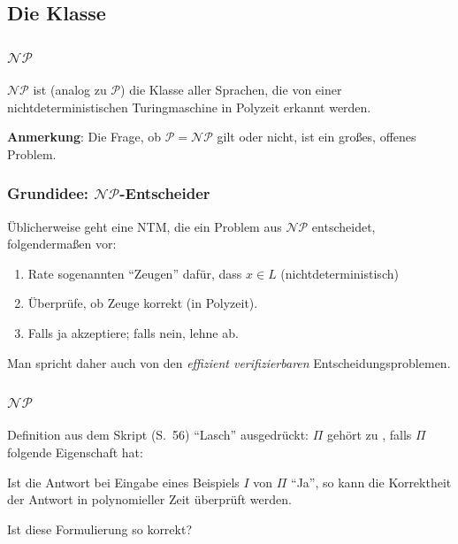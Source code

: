 

\subsection{Die Klasse \classNP}
\begin{frame}
\frametitle{$\mathcal{NP}$}

$\mathcal{NP}$ ist (analog zu $\mathcal{P}$) die Klasse aller Sprachen, die von einer nichtdeterministischen Turingmaschine in Polyzeit erkannt werden.

\ducttape{1cm}

\textbf{Anmerkung}: Die Frage, ob $\mathcal{P} = \mathcal{NP}$ gilt oder nicht, ist ein großes, offenes Problem.
\end{frame}

\begin{frame}
\frametitle{Grundidee: $\mathcal{NP}$-Entscheider}
Üblicherweise geht eine NTM, die ein Problem aus $\mathcal{NP}$ entscheidet, folgendermaßen vor: 
\begin{enumerate}
\item Rate sogenannten "`Zeugen"' dafür, dass $x \in L$ (nichtdeterministisch)
\item Überprüfe, ob Zeuge korrekt (in Polyzeit).
\item Falls ja akzeptiere; falls nein, lehne ab.
\end{enumerate}
Man spricht daher auch von den \emph{effizient verifizierbaren} Entscheidungsproblemen.
\end{frame}

\begin{frame}
\frametitle{$\mathcal{NP}$}

\begin{block}{Definition aus dem Skript (S.~56)}
"`Lasch"' ausgedrückt: $\Pi$ gehört zu \classNP, falls $\Pi$ folgende Eigenschaft hat:

Ist die Antwort bei Eingabe eines Beispiels $I$ von $\Pi$ "`Ja"', so kann die Korrektheit der Antwort in polynomieller Zeit überprüft werden.
\end{block}

\ducttape{1cm}

Ist diese Formulierung so korrekt?

\end{frame}

